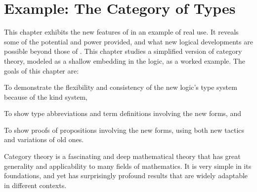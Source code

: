 
\chapter{Example: The Category of Types}\label{chap:simple-cat}

This chapter exhibits the new features of \HOLW{} in an example
of real use.  It reveals some of the potential and power provided,
and what new logical developments are possible beyond those of \HOL{}.
%
This chapter studies a simplified version of category theory,
modeled as a shallow embedding in the \HOLW{} logic, as a worked example.
The goals of this chapter are:

\begin{myenumerate}
\item To demonstrate the flexibility and consistency
      of the new logic's type system because of the kind system,
\item To show type abbreviations and term definitions involving the new forms, and
\item To show proofs of propositions involving the new forms,
      using both new tactics and variations of old ones.
\end{myenumerate}

Category theory is a fascinating and deep mathematical theory that has great
generality and applicability to many fields of mathematics.
It is very simple in its foundations, and yet has surprisingly
profound results that are widely adaptable in different contexts.


